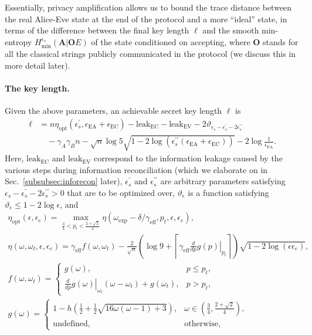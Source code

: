 \documentclass[aps,reprint,showpacs,superscriptaddress]{revtex4-2}
\begin{document}
Essentially, privacy amplification allows us to bound the trace distance between the real Alice-Eve state at the end of the protocol and a more ``ideal'' state, in terms of the difference between the final key length $\ell$ and the smooth min-entropy $H_{\min}^{\epsilon_{s}}\left(\mathbf{A}|\mathbf{O}E\right)$ of the state conditioned on accepting, where $\mathbf{O}$ stands for all the classical strings publicly communicated in the protocol (we discuss this in more detail later).

\paragraph{The key length.} Given the above parameters, an achievable secret key length $\ell$ is
\begin{align}
\ell & = n\eta_{\mathrm{opt}}\left(\epsilon_{s}^{\prime},\epsilon_{\mathrm{EA}}+\epsilon_{\mathrm{EC}}\right)-\mathrm{leak}_{\mathrm{EC}}
-\mathrm{leak}_{\mathrm{EV}}
-2\vartheta_{\epsilon_{s}-\epsilon_{s}^{\prime}-2\epsilon_{s}^{\prime\prime}}\nonumber \\
& \quad-\gamma_{A}\gamma_{B}n-\sqrt{n}\log5\sqrt{1-2\log\left(\epsilon_{s}^{\prime\prime}\left(\epsilon_{\mathrm{EA}}+\epsilon_{\mathrm{EC}}\right)\right)}-2\log\frac{1}{\epsilon_{\mathrm{PA}}}.\label{eq:kr-AFRV}
\end{align}
Here, $\mathrm{leak}_{\mathrm{EC}}$ and $\mathrm{leak}_{\mathrm{EV}}$ correspond to the information leakage
	caused by the various steps during information reconciliation (which we elaborate on in Sec.~\ref{subsubsec:inforecon} later), $\epsilon_{s}^{\prime}$ and $\epsilon_{s}^{\prime\prime}$ are arbitrary parameters satisfying $\epsilon_{s}-\epsilon_{s}^{\prime}-2\epsilon_{s}^{\prime\prime}>0$ that are to be optimized over, $\vartheta_{\epsilon}$ is a function satisfying $\vartheta_{\epsilon}\leqslant1-2\log\epsilon$,
and
\begin{gather}
\eta_{\mathrm{opt}}\left(\epsilon,\epsilon_{e}\right)=\max_{\frac{3}{4}<p_{t}<\frac{2+\sqrt{2}}{4}}\eta\left(\omega_{\mathrm{exp}}-\delta/\gamma_{\mathrm{eff}},p_{t},\epsilon,\epsilon_{e}\right),\\
\eta\left(\omega,\omega_{t},\epsilon,\epsilon_{e}\right)=\gamma_{\mathrm{eff}}f\left(\omega,\omega_{t}\right)-\frac{2}{\sqrt{n}}\left(\log9+\left\lceil \gamma_{\mathrm{eff}}\left.\frac{d}{dp}g\left(p\right)\right|_{p_{t}}\right\rceil \right)\sqrt{1-2\log\left(\epsilon\epsilon_{e}\right)},\\
f\left(\omega,\omega_{t}\right)=\begin{cases}
g\left(\omega\right), & p\leqslant p_{t},\\
\left.\frac{d}{dp}g\left(\omega\right)\right|_{\omega_{t}}\left(\omega-\omega_{t}\right)+g\left(\omega_{t}\right), & p>p_{t},
\end{cases}\label{eq:fmin-AFRV}\\
g\left(\omega\right)=\begin{cases}
1-h\left(\frac{1}{2}+\frac{1}{2}\sqrt{16\omega\left(\omega-1\right)+3}\right), & \omega\in\left(\frac{3}{4},\frac{2+\sqrt{2}}{4}\right),\\
\text{undefined,} & \text{otherwise,}
\end{cases}
\end{gather}
\end{document}
